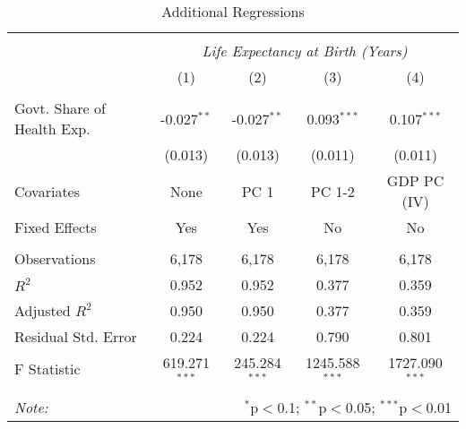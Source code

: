 \begin{table}[!htbp] \centering
  \caption{Additional Regressions \label{additional_regs}}
\begin{tabular}{@{\extracolsep{5pt}}lcccc}
\\[-1.8ex]\hline
\hline \\[-1.8ex]
& \multicolumn{4}{c}{\textit{Life Expectancy at Birth (Years)}} \
\cr \
\\[-1.8ex] & (1) & (2) & (3) & (4) \\
\hline \\[-1.8ex]
 Govt. Share of Health Exp. & -0.027$^{**}$ & -0.027$^{**}$ & 0.093$^{***}$ & 0.107$^{***}$ \\
  & (0.013) & (0.013) & (0.011) & (0.011) \\
 Covariates & None & PC 1 & PC 1-2 & GDP PC (IV) \\
 Fixed Effects & Yes & Yes & No & No \\
\hline \\[-1.8ex]
 Observations & 6,178 & 6,178 & 6,178 & 6,178 \\
 $R^2$ & 0.952 & 0.952 & 0.377 & 0.359 \\
 Adjusted $R^2$ & 0.950 & 0.950 & 0.377 & 0.359 \\
 Residual Std. Error & 0.224 & 0.224 & 0.790 & 0.801  \\
 F Statistic & 619.271$^{***}$  & 245.284$^{***}$  & 1245.588$^{***}$  & 1727.090$^{***}$  \\
\hline
\hline \\[-1.8ex]
\textit{Note:} & \multicolumn{4}{r}{$^{*}$p$<$0.1; $^{**}$p$<$0.05; $^{***}$p$<$0.01} \\
\end{tabular}
\end{table}